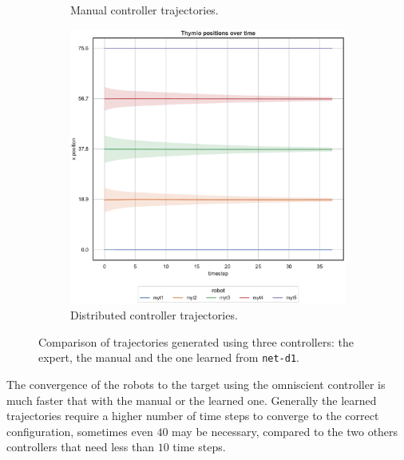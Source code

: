 \begin{figure}[!htb]
\begin{center}
\begin{subfigure}[h]{0.49\textwidth}
			\caption{Manual controller trajectories.}
		\end{subfigure}
		\hfill
		\begin{subfigure}[h]{0.49\textwidth}
			\centering
			\includegraphics[width=.9\textwidth]{contents/images/net-d1/position-overtime-learned_distributed}
			\caption{Distributed controller trajectories.}
		\end{subfigure}
	\end{center}
	\caption[Evaluation of the trajectories learned by \texttt{net-d1}.]{Comparison 
		of trajectories generated using three controllers: the expert, the manual and 
		the one learned from \texttt{net-d1}.}
	\label{fig:net-d1traj}
\end{figure}
The convergence of the robots to the target using the omniscient controller is 
much faster that with the manual or the learned one. Generally the learned 
trajectories require a higher number of time steps to converge to the correct 
configuration, sometimes even $40$ may be necessary, compared to the two 
others controllers that need less than $10$ time steps.

